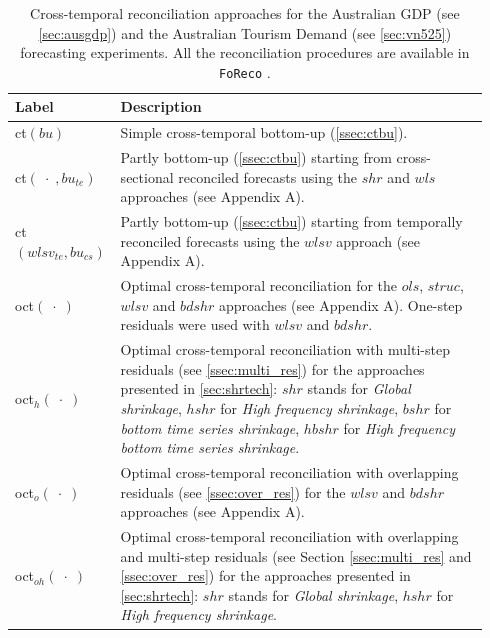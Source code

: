 \documentclass[12pt]{article}
\theoremstyle{definition}
\begin{document}
\begin{table}[!t]
	\centering
	\begin{tabular}{M{0.17\linewidth}|L{0.77\linewidth}}
		\toprule
		\textbf{Label} & \textbf{Description} \\
		\midrule
		ct$(bu)$ & Simple cross-temporal bottom-up (\autoref{ssec:ctbu}). \\
		\addlinespace[0.15cm]
		ct$(\;\cdot\;, bu_{te})$ & Partly bottom-up (\autoref{ssec:ctbu}) starting from cross-sectional reconciled forecasts using the $shr$ and $wls$ approaches (see Appendix A).\\
		\addlinespace[0.15cm]
		ct$(wlsv_{te}, bu_{cs})$ & Partly bottom-up (\autoref{ssec:ctbu}) starting from temporally reconciled forecasts using the $wlsv$ approach (see Appendix A).\\
		\addlinespace[0.15cm]
		oct$(\;\cdot\;)$ & Optimal cross-temporal reconciliation for the $ols$, $struc$, $wlsv$ and $bdshr$ approaches (see Appendix A). One-step residuals were used with $wlsv$ and $bdshr$. \\
		\addlinespace[0.15cm]
		oct$_h(\;\cdot\;)$ & Optimal cross-temporal reconciliation with multi-step residuals (see \autoref{ssec:multi_res}) for the approaches presented in \autoref{sec:shrtech}: $shr$ stands for \textit{Global shrinkage}, $hshr$ for \textit{High frequency shrinkage}, $bshr$ for \textit{bottom time series shrinkage}, $hbshr$ for \textit{High frequency bottom time series shrinkage}.\\
		\addlinespace[0.15cm]
		oct$_o(\;\cdot\;)$ & Optimal cross-temporal reconciliation with overlapping residuals (see \autoref{ssec:over_res}) for the $wlsv$ and $bdshr$ approaches (see Appendix A). \\
		\addlinespace[0.15cm]
		oct$_{oh}(\;\cdot\;)$ & Optimal cross-temporal reconciliation with overlapping and multi-step residuals (see Section \ref{ssec:multi_res} and \ref{ssec:over_res}) for the approaches presented in \autoref{sec:shrtech}: $shr$ stands for \textit{Global shrinkage}, $hshr$ for \textit{High frequency shrinkage}.\\
		\bottomrule
	\end{tabular}%
	\caption{Cross-temporal reconciliation approaches for %
	the Australian GDP (see \autoref{sec:ausgdp}) and the Australian Tourism Demand (see \autoref{sec:vn525}) forecasting experiments. All the reconciliation procedures are available in \texttt{FoReco} \citep{foreco2023}.}
	\label{tab:notation}
	\vspace*{-0.5\baselineskip}
\end{table}
\end{document}
